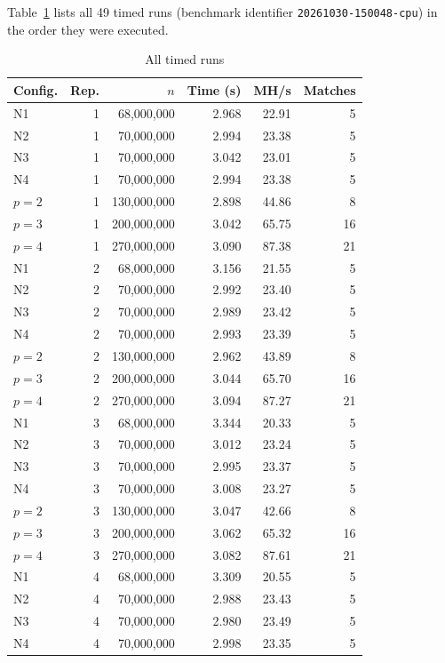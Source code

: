 \documentclass[conference,10pt]{IEEEtran}
\begin{document}
Table~\ref{tab:raw} lists all 49 timed runs (benchmark identifier \texttt{20261030-150048-cpu}) in the order they were executed.

\begin{table}[h]
\caption{All timed runs}
\label{tab:raw}
\centering\footnotesize
\setlength{\tabcolsep}{3.5pt}
\begin{tabular}{@{}lrrrrr@{}}
\toprule
Config. & Rep. & $n$ & Time (s) & MH/s & Matches \\
\midrule
N1 & 1 & 68,000,000 & 2.968 & 22.91 & 5 \\
N2 & 1 & 70,000,000 & 2.994 & 23.38 & 5 \\
N3 & 1 & 70,000,000 & 3.042 & 23.01 & 5 \\
N4 & 1 & 70,000,000 & 2.994 & 23.38 & 5 \\
$p{=}2$ & 1 & 130,000,000 & 2.898 & 44.86 & 8 \\
$p{=}3$ & 1 & 200,000,000 & 3.042 & 65.75 & 16 \\
$p{=}4$ & 1 & 270,000,000 & 3.090 & 87.38 & 21 \\
N1 & 2 & 68,000,000 & 3.156 & 21.55 & 5 \\
N2 & 2 & 70,000,000 & 2.992 & 23.40 & 5 \\
N3 & 2 & 70,000,000 & 2.989 & 23.42 & 5 \\
N4 & 2 & 70,000,000 & 2.993 & 23.39 & 5 \\
$p{=}2$ & 2 & 130,000,000 & 2.962 & 43.89 & 8 \\
$p{=}3$ & 2 & 200,000,000 & 3.044 & 65.70 & 16 \\
$p{=}4$ & 2 & 270,000,000 & 3.094 & 87.27 & 21 \\
N1 & 3 & 68,000,000 & 3.344 & 20.33 & 5 \\
N2 & 3 & 70,000,000 & 3.012 & 23.24 & 5 \\
N3 & 3 & 70,000,000 & 2.995 & 23.37 & 5 \\
N4 & 3 & 70,000,000 & 3.008 & 23.27 & 5 \\
$p{=}2$ & 3 & 130,000,000 & 3.047 & 42.66 & 8 \\
$p{=}3$ & 3 & 200,000,000 & 3.062 & 65.32 & 16 \\
$p{=}4$ & 3 & 270,000,000 & 3.082 & 87.61 & 21 \\
N1 & 4 & 68,000,000 & 3.309 & 20.55 & 5 \\
N2 & 4 & 70,000,000 & 2.988 & 23.43 & 5 \\
N3 & 4 & 70,000,000 & 2.980 & 23.49 & 5 \\
N4 & 4 & 70,000,000 & 2.998 & 23.35 & 5 \\

\end{tabular}
\end{table}
\end{document}
